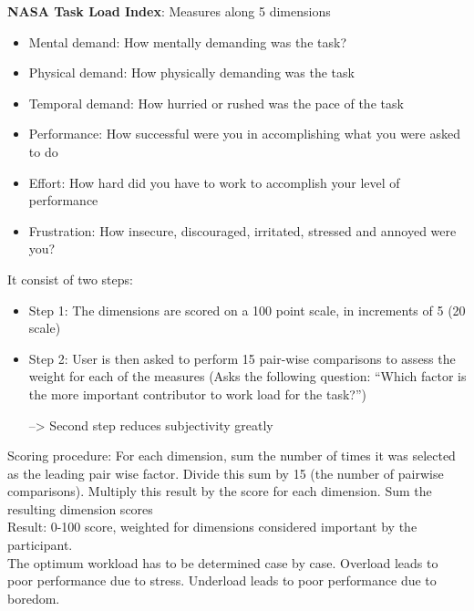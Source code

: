 \textbf{NASA Task Load Index}: Measures along 5 dimensions
\begin{itemize}
\item Mental demand: How mentally demanding was the task?
\item Physical demand: How physically demanding was the task
\item Temporal demand: How hurried or rushed was the pace of the task
\item Performance: How successful were you in accomplishing what you were asked to do
\item Effort: How hard did you have to work to accomplish your level of performance
\item Frustration: How insecure, discouraged, irritated, stressed and annoyed were you?
\end{itemize}
It consist of two steps:
\begin{itemize}
\item Step 1: The dimensions are scored on a 100 point scale, in increments of 5 (20 scale)
\item Step 2: User is then asked to perform 15 pair-wise comparisons to assess the weight for each of the measures (Asks the following question: “Which factor is the more
important contributor to work load for the task?”)
\item[-->] Second step reduces subjectivity greatly
\end{itemize}
Scoring procedure: For each dimension, sum the number of times it was selected as the leading pair wise factor. Divide this sum by 15 (the number of pairwise comparisons). Multiply this result by the score for each dimension. Sum the resulting dimension scores\\
Result: 0-100 score, weighted for dimensions considered important by the participant.\\
The optimum workload has to be determined case by case. Overload leads to poor performance due to stress. Underload leads to poor performance due to boredom.

